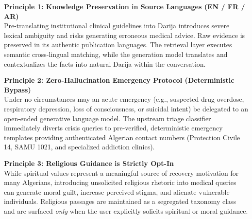 \documentclass[10pt,a4paper]{article}
\begin{document}
\vspace{2.5mm}

\begin{tcolorbox}[colback=subtleblue!50, colframe=accentblue!60, boxrule=0.6pt, arc=3pt, left=10pt, right=10pt, top=6pt, bottom=6pt]
\textbf{\color{primarynavy} Principle 1: Knowledge Preservation in Source Languages (EN / FR / AR)}\\
\footnotesize Pre-translating institutional clinical guidelines into Darija introduces severe lexical ambiguity and risks generating erroneous medical advice. Raw evidence is preserved in its authentic publication languages. The retrieval layer executes semantic cross-lingual matching, while the generation model translates and contextualizes the facts into natural Darija within the conversation.
\end{tcolorbox}

\vspace{1.5mm}

\begin{tcolorbox}[colback=subtlered!50, colframe=darkcrimson!60, boxrule=0.6pt, arc=3pt, left=10pt, right=10pt, top=6pt, bottom=6pt]
\textbf{\color{darkcrimson} Principle 2: Zero-Hallucination Emergency Protocol (Deterministic Bypass)}\\
\footnotesize Under no circumstances may an acute emergency (e.g., suspected drug overdose, respiratory depression, loss of consciousness, or suicidal intent) be delegated to an open-ended generative language model. The upstream triage classifier immediately diverts crisis queries to pre-verified, deterministic emergency templates providing authenticated Algerian contact numbers (Protection Civile 14, SAMU 1021, and specialized addiction clinics).
\end{tcolorbox}

\vspace{1.5mm}

\begin{tcolorbox}[colback=slatebg, colframe=amberbrown!60, boxrule=0.6pt, arc=3pt, left=10pt, right=10pt, top=6pt, bottom=6pt]
\textbf{\color{amberbrown} Principle 3: Religious Guidance is Strictly Opt-In}\\
\footnotesize While spiritual values represent a meaningful source of recovery motivation for many Algerians, introducing unsolicited religious rhetoric into medical queries can generate moral guilt, increase perceived stigma, and alienate vulnerable individuals. Religious passages are maintained as a segregated taxonomy class and are surfaced \textit{only} when the user explicitly solicits spiritual or moral guidance.
\end{tcolorbox}
\end{document}
